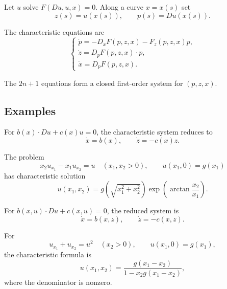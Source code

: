 Let $u$ solve $F(Du,u,x)=0$. Along a curve $x=x(s)$ set
\[
z(s)=u(x(s)),\qquad p(s)=Du(x(s)).
\]

\begin{theorem}
\label{thm:characteristic-ode-structure}
The characteristic equations are
\[
\begin{cases}
\dot p=-D_xF(p,z,x)-F_z(p,z,x)p,\\
\dot z=D_pF(p,z,x)\cdot p,\\
\dot x=D_pF(p,z,x).
\end{cases}
\]
\end{theorem}

\begin{remark}
\label{rem:characteristic-ode-closure}

The $2n+1$ equations form a closed first-order system for $(p,z,x)$.
\end{remark}

\subsection{Examples}
\label{sec:characteristics-examples}

For $b(x)\cdot Du+c(x)u=0$, the characteristic system reduces to
\[
\dot x=b(x),\qquad \dot z=-c(x)z.
\]

\begin{example}
\label{ex:linear-pde-quadrant-characteristics}

The problem
\[
x_2u_{x_1}-x_1u_{x_2}=u\quad(x_1,x_2>0),
\qquad u(x_1,0)=g(x_1)
\]
has characteristic solution
\[
u(x_1,x_2)=g\!\left(\sqrt{x_1^2+x_2^2}\right)
\exp\!\left(\arctan\frac{x_2}{x_1}\right).
\]
\end{example}

For $b(x,u)\cdot Du+c(x,u)=0$, the reduced system is
\[
\dot x=b(x,z),\qquad \dot z=-c(x,z).
\]

\begin{example}
\label{ex:semilinear-pde-halfspace-characteristics}

For
\[
u_{x_1}+u_{x_2}=u^2\quad(x_2>0),\qquad u(x_1,0)=g(x_1),
\]
the characteristic formula is
\[
u(x_1,x_2)=\frac{g(x_1-x_2)}{1-x_2g(x_1-x_2)},
\]
where the denominator is nonzero.
\end{example}

